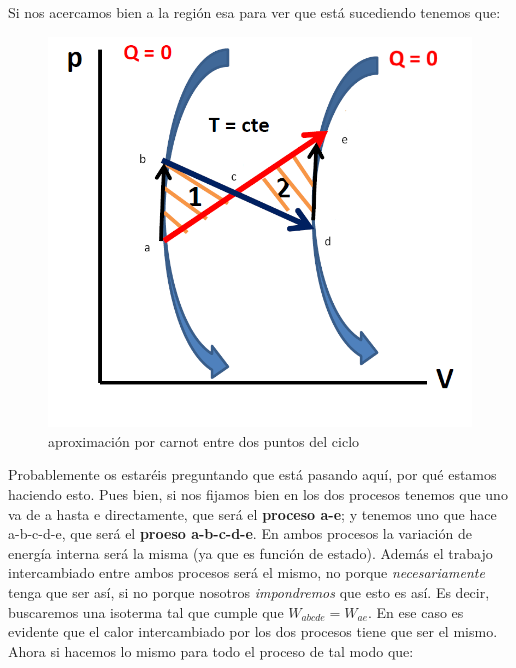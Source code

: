 \documentclass[12pt,a4paper]{article}
\begin{document}
Si nos acercamos bien a la región esa para ver que está sucediendo tenemos que:

\begin{figure}[h!] \centering
\includegraphics[scale=0.5]{teorema-clausius-2.png}
\caption{aproximación por carnot entre dos puntos del ciclo}
\label{fig:5-2}
\end{figure}

Probablemente os estaréis preguntando que está pasando aquí, por qué estamos haciendo esto. Pues bien, si nos fijamos bien en los dos procesos tenemos que uno va de a hasta e directamente, que será el \textbf{proceso a-e}; y tenemos uno que hace a-b-c-d-e, que será el \textbf{proeso a-b-c-d-e}. En ambos procesos la variación de energía interna será la misma (ya que es función de estado). Además el trabajo intercambiado entre ambos procesos será el mismo, no porque \textit{necesariamente} tenga que ser así, si no porque nosotros \textit{impondremos} que esto es así. Es decir, buscaremos una isoterma tal que cumple que $W_{abcde}=W_{ae}$. En ese caso es evidente que el calor intercambiado por los dos procesos tiene que ser el mismo. Ahora si hacemos lo mismo para todo el proceso de tal modo que: 
\end{document}
